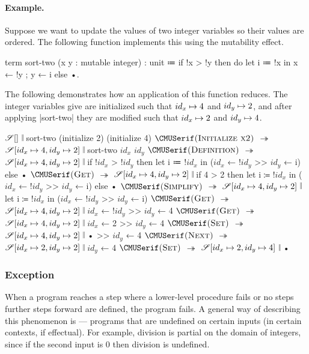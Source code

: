 
\paragraph{Example.}
Suppose we want to update the values of two integer variables so their values are ordered.
The following function implements this using the mutability effect.
%
\begin{snippet}
term sort-two (x y : mutable integer) : unit
  ≔ if !x > !y
      then do
        { let i ≔ !x in
          x ← !y
        ; y ← i  }
      else •.
\end{snippet}
%
The following demonstrates how an application of this function reduces.
The integer variables give are initialized such that $id_x \mapsto 4$ and $id_y \mapsto 2$, and after applying \code|sort-two| they are modified such that $id_x \mapsto 2$ and $id_y \mapsto 4$.
%
\begin{snippet}
$\mathscr{S}[]$ 𝄁 sort-two (initialize 2) (initialize 4)
$\ruleapp{Initialize x2}$
$↠$ $\mathscr{S}[id_x \mapsto 4, id_y \mapsto 2]$ 𝄁 sort-two $id_x$ $id_y$
$\ruleapp{Definition}$
$↠$ $\mathscr{S}[id_x \mapsto 4, id_y \mapsto 2]$ 𝄁 if !$id_x$ > !$id_y$
                        then let i ≔ !$id_x$ in ($id_x$ ← !$id_y$ >> $id_y$ ← i)
                        else •
$\ruleapp{Get}$
$↠$ $\mathscr{S}[id_x \mapsto 4, id_y \mapsto 2]$ 𝄁 if 4 > 2
                        then let i ≔ !$id_x$ in ($id_x$ ← !$id_y$ >> $id_y$ ← i)
                        else •
$\ruleapp{Simplify}$
$↠$ $\mathscr{S}[id_x \mapsto 4, id_y \mapsto 2]$ 𝄁 let i ≔ !$id_x$ in ($id_x$ ← !$id_y$ >> $id_y$ ← i)
$\ruleapp{Get}$
$↠$ $\mathscr{S}[id_x \mapsto 4, id_y \mapsto 2]$ 𝄁 $id_x$ ← !$id_y$ >> $id_y$ ← 4
$\ruleapp{Get}$
$↠$ $\mathscr{S}[id_x \mapsto 4, id_y \mapsto 2]$ 𝄁 $id_x$ ← 2 >> $id_y$ ← 4
$\ruleapp{Set}$
$↠$ $\mathscr{S}[id_x \mapsto 4, id_y \mapsto 2]$ 𝄁 • >> $id_y$ ← 4
$\ruleapp{Next}$
$↠$ $\mathscr{S}[id_x \mapsto 2, id_y \mapsto 2]$ 𝄁 $id_y$ ← 4
$\ruleapp{Set}$
$↠$ $\mathscr{S}[id_x \mapsto 2, id_y \mapsto 4]$ 𝄁 •
\end{snippet}

\subsubsection{Exception}

When a program reaches a step where a lower-level procedure fails or no steps further steps forward are defined, the program fails. A general way of describing this phenomenon is  --- programs that are undefined on certain inputs (in certain contexts, if effectual). For example, division is partial on the domain of integers, since if the second input is 0 then division is undefined.

